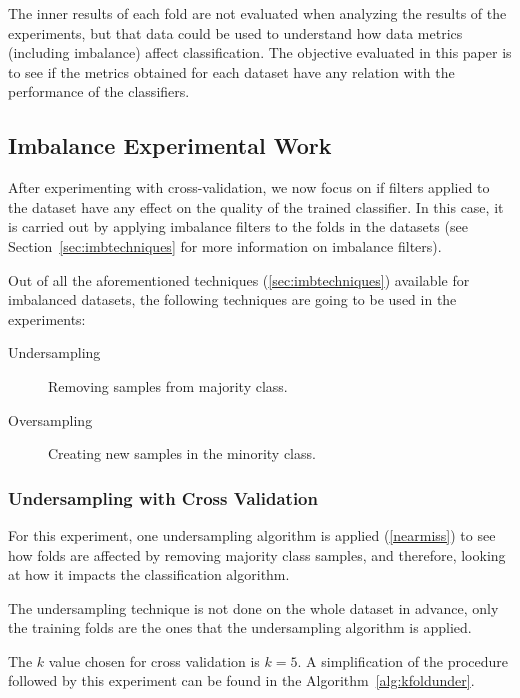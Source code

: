 The inner results of each fold are not evaluated when analyzing the results of 
the experiments, but that data could be used to understand how data metrics 
(including imbalance) affect classification. The objective evaluated in this 
paper is to see if the metrics obtained for each dataset have any relation with 
the performance of the classifiers. 

\subsection{Imbalance Experimental Work}

After experimenting with cross-validation, we now focus on if filters applied 
to the dataset have any effect on the quality of the trained classifier. In this
case, it is carried out by applying imbalance filters to the folds in the 
datasets (see Section~\ref{sec:imbtechniques} for more information on imbalance 
filters).

Out of all the aforementioned techniques (\ref{sec:imbtechniques}) available for 
imbalanced datasets, the following techniques are going to be used in the 
experiments:

\begin{description}
    \item [Undersampling] Removing samples from majority class.
    \item [Oversampling] Creating new samples in the minority class.
\end{description}

\subsubsection{Undersampling with Cross Validation}
\label{sec:kfoldunder}

For this experiment, one undersampling algorithm is applied 
(\ref{nearmiss}) to see how folds are affected by removing majority class 
samples, and therefore, looking at how it impacts the classification algorithm. 

The undersampling technique is not done on the whole dataset in advance, only 
the training folds are the ones that the undersampling algorithm is applied. 

The $k$ value chosen for cross validation is $k=5$. A simplification
of the procedure followed by this experiment can be found in the 
Algorithm~\ref{alg:kfoldunder}.

